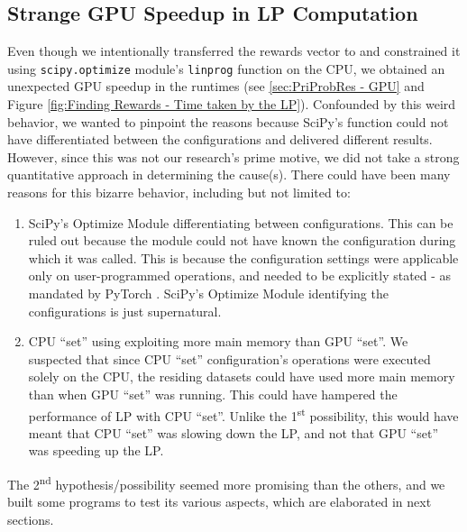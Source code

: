 \begin{appendices}
    \section{Strange GPU Speedup in LP Computation} \label{sec:Strange GPU Speedup in LP Computation}
    Even though we intentionally transferred the rewards vector to and constrained it using \texttt{scipy.optimize} module's \texttt{linprog} function on the CPU, we obtained an unexpected GPU speedup in the runtimes (see \cref{sec:PriProbRes - GPU} and Figure \ref{fig:Finding Rewards - Time taken by the LP}). Confounded by this weird behavior, we wanted to pinpoint the reasons because SciPy's function could not have differentiated between the configurations and delivered different results. However, since this was not our research's prime motive, we did not take a strong quantitative approach in determining the cause(s). There could have been many reasons for this bizarre behavior, including but not limited to:
    \begin{enumerate}
        \item SciPy's Optimize Module differentiating between configurations. This can be ruled out because the module could not have known the configuration during which it was called. This is because the configuration settings were applicable only on user-programmed operations, and needed to be explicitly stated - as mandated by PyTorch \cite{PTDocs}. SciPy's Optimize Module identifying the configurations is just supernatural.
        \item CPU ``set'' using exploiting more main memory than GPU ``set''. We suspected that since CPU ``set'' configuration's operations were executed solely on the CPU, the residing datasets could have used more main memory than when GPU ``set'' was running. This could have hampered the performance of LP with CPU ``set''. Unlike the 1\textsuperscript{st} possibility, this would have meant that CPU ``set'' was slowing down the LP, and not that GPU ``set'' was speeding up the LP.
    \end{enumerate}

    The 2\textsuperscript{nd} hypothesis/possibility seemed more promising than the others, and we built some programs to test its various aspects, which are elaborated in next sections.
    

\end{appendices}
